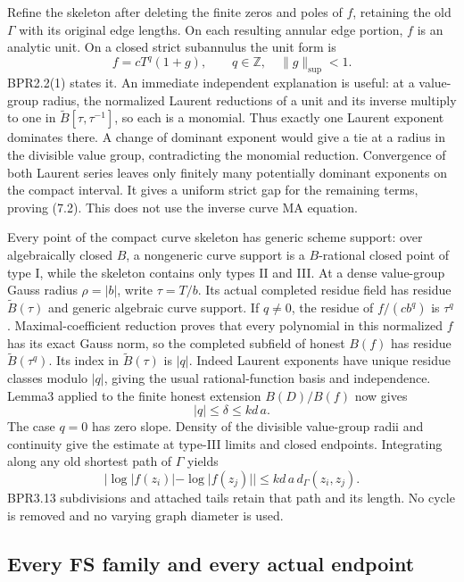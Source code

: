 \documentclass[
  11pt,
]{article}
\begin{document}
Refine the skeleton after deleting the finite zeros and poles of \(f\),
retaining the old \(\Gamma\) with its original edge lengths. On each
resulting annular edge portion, \(f\) is an analytic unit. On a closed
strict subannulus the unit form is \[
 f=cT^q(1+g),\qquad q\in\mathbb Z,\quad\|g\|_{\sup}<1. \tag{7.2}
\] BPR2.2(1) states it. An immediate independent explanation is useful:
at a value-group radius, the normalized Laurent reductions of a unit and
its inverse multiply to one in \(\widetilde B[\tau,\tau^{-1}]\), so each
is a monomial. Thus exactly one Laurent exponent dominates there. A
change of dominant exponent would give a tie at a radius in the
divisible value group, contradicting the monomial reduction. Convergence
of both Laurent series leaves only finitely many potentially dominant
exponents on the compact interval. It gives a uniform strict gap for the
remaining terms, proving (7.2). This does not use the inverse curve MA
equation.

Every point of the compact curve skeleton has generic scheme support:
over algebraically closed \(B\), a nongeneric curve support is a
\(B\)-rational closed point of type I, while the skeleton contains only
types II and III. At a dense value-group Gauss radius \(\rho=|b|\),
write \(\tau=T/b\). Its actual completed residue field has residue
\(\widetilde B(\tau)\) and generic algebraic curve support. If
\(q\ne0\), the residue of \(f/(cb^q)\) is \(\tau^q\).
Maximal-coefficient reduction proves that every polynomial in this
normalized \(f\) has its exact Gauss norm, so the completed subfield of
honest \(B(f)\) has residue \(\widetilde B(\tau^q)\). Its index in
\(\widetilde B(\tau)\) is \(|q|\). Indeed Laurent exponents have unique
residue classes modulo \(|q|\), giving the usual rational-function basis
and independence. Lemma3 applied to the finite honest extension
\(B(D)/B(f)\) now gives \[
 |q|\leq\delta\leq kd\,a. \tag{7.3}
\] The case \(q=0\) has zero slope. Density of the divisible value-group
radii and continuity give the estimate at type-III limits and closed
endpoints. Integrating along any old shortest path of \(\Gamma\) yields
\[
 |\log|f(z_i)|-\log|f(z_j)||
       \leq kd\,a\,d_\Gamma(z_i,z_j). \tag{7.4}
\] BPR3.13 subdivisions and attached tails retain that path and its
length. No cycle is removed and no varying graph diameter is used.

\subsection{Every FS family and every actual
endpoint}\label{every-fs-family-and-every-actual-endpoint}
\end{document}
